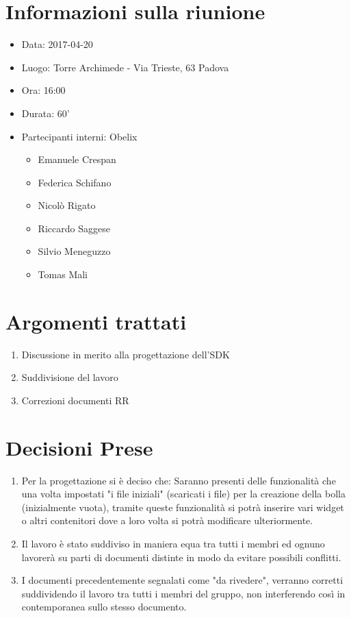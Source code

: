 \documentclass[10 pt,a4paper, openany]{article}
\date{}
\begin{document}
\paginatitolo
\section{Informazioni sulla riunione}

\begin{itemize}
\item[] Data: 2017-04-20
\item[] Luogo: Torre Archimede - Via Trieste, 63 Padova
\item[] Ora: 16:00
\item[] Durata: 60'
\item[] Partecipanti interni: Obelix
  \begin{itemize}
  \item[] Emanuele Crespan
  \item[] Federica Schifano
  \item[] Nicolò Rigato
  \item[] Riccardo Saggese
  \item[] Silvio Meneguzzo
  \item[] Tomas Mali
 \end{itemize}
\end{itemize}

\section{Argomenti trattati}
\begin{enumerate}
	\item Discussione in merito alla progettazione dell’SDK 
	\item Suddivisione del lavoro
	\item Correzioni documenti RR
\end{enumerate}

\section{Decisioni Prese}
\begin{enumerate}
	\item Per la progettazione si è deciso che:
	Saranno presenti delle funzionalità che una volta impostati "i file iniziali" (scaricati i file) per la creazione della bolla (inizialmente vuota), tramite queste funzionalità si potrà inserire vari widget o altri contenitori dove a loro volta si potrà modificare ulteriormente.

	\item Il lavoro è stato suddiviso in maniera equa tra tutti i membri ed ognuno lavorerà su parti di documenti distinte in modo da evitare possibili conflitti.	

	\item I documenti precedentemente segnalati come "da rivedere", verranno corretti suddividendo il lavoro tra tutti i membri del gruppo, non interferendo così in contemporanea sullo stesso documento.
	
	
\end{enumerate}
\end{document}
